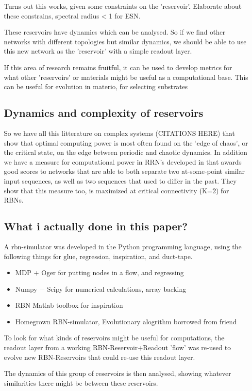 Turns out this works, given some constraints on the 'reservoir'.
Elaborate about these constrains, spectral radius < 1 for ESN.

These reservoirs have dynamics which can be analysed.
So if we find other networks with different topologies but similar dynamics,
we should be able to use this new network as the 'reservoir' with a simple readout layer.

If this area of research remains fruitful, it can be used to develop metrics for what other 'reservoirs' or materials might be useful as a  computational base.
This can be useful for evolution in materio, for selecting substrates \cite{evolutionInMaterio}


\subsection{Dynamics and complexity of reservoirs}

So we have all this litterature on complex systems (CITATIONS HERE) that show that optimal computing power is most often found on the 'edge of chaos', or the critical state, on the edge between periodic and chaotic dynamics.
In addition we have a measure for computational power in RRN's developed in \cite{rbn-reservoir} that awards good scores to networks that are able to both separate two at-some-point similar input sequences, as well as two sequences that used to differ in the past.
They show that this measure too, is maximized at critical connectivity (K=2) for RBNs.

\subsection{What i actually done in this paper?}

A rbn-simulator was developed in the Python programming language,
using the following things for glue, regression, inspiration, and duct-tape.

\begin{itemize}
  \item MDP + Oger for putting nodes in a flow, and regressing
  \item Numpy + Scipy for numerical calculations, array backing
  \item RBN Matlab toolbox for inspiration
  \item Homegrown RBN-simulator, Evolutionary alogrithm borrowed from friend
\end{itemize}

To look for what kinds of reservoirs might be useful for computations,
the readout layer from a working RBN-Reservoir+Readout 'flow' was re-used to evolve new RBN-Reservoirs that could re-use this readout layer.

The dynamics of this group of reservoirs is then analysed,
showing whatever similarities there might be between these reservoirs.
